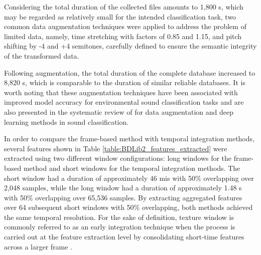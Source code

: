 Considering the total duration of the collected files amounts to 1,800 \gls{s}, which may be regarded as relatively small for the intended classification task, two common data augmentation techniques were applied to address the problem of limited data, namely, time stretching with factors of 0.85 and 1.15, and pitch shifting by -4 and +4 semitones, carefully defined to ensure the semantic integrity of the transformed data. 

Following augmentation, the total duration of the complete database increased to 8,820 \gls{s}, which is comparable to the duration of similar reliable databases. It is worth noting that these augmentation techniques have been associated with improved model accuracy for environmental sound classification tasks \cite{Salamon2017} and are also presented in the systematic review of \textcite{Alli2022} for data augmentation and deep learning methods in sound classification.

In order to compare the frame-based method with temporal integration methods, several features shown in Table \ref{table:BDLib2_features_extracted} were extracted using two different window configurations: long windows for the frame-based method and short windows for the temporal integration methods. The short window had a duration of approximately 46 \gls{mi}\gls{s} with 50\% overlapping over 2,048 samples, while the long window had a duration of approximately 1.48 \gls{s} with 50\% overlapping over 65,536 samples. By extracting aggregated features over 64 subsequent short windows with 50\% overlapping, both methods achieved the same temporal resolution. For the sake of definition, 
texture window is commonly referred to as an early integration technique when the process is carried out at the feature extraction level by consolidating short-time features across a larger frame \cite{Bountourakis2019}.


